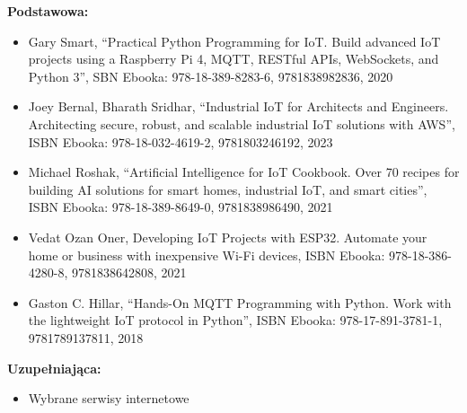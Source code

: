 \documentclass[12pt, a4paper]{article}
\begin{document}
\textbf{Podstawowa:}
\begin{itemize}
  \item Gary Smart, “Practical Python Programming for IoT. Build advanced IoT projects using a Raspberry Pi 4, MQTT, RESTful APIs, WebSockets, and Python 3”, SBN Ebooka: 978-18-389-8283-6, 9781838982836, 2020
  \item Joey Bernal, Bharath Sridhar, “Industrial IoT for Architects and Engineers. Architecting secure, robust, and scalable industrial IoT solutions with AWS”, ISBN Ebooka: 978-18-032-4619-2, 9781803246192, 2023
  \item Michael Roshak, “Artificial Intelligence for IoT Cookbook. Over 70 recipes for building AI solutions for smart homes, industrial IoT, and smart cities”, ISBN Ebooka: 978-18-389-8649-0, 9781838986490, 2021
  \item Vedat Ozan Oner, Developing IoT Projects with ESP32. Automate your home or business with inexpensive Wi-Fi devices, ISBN Ebooka: 978-18-386-4280-8, 9781838642808, 2021
  \item Gaston C. Hillar, “Hands-On MQTT Programming with Python. Work with the lightweight IoT protocol in Python”, ISBN Ebooka: 978-17-891-3781-1, 9781789137811, 2018
\end{itemize}

\textbf{Uzupełniająca:}
\begin{itemize}
  \item Wybrane serwisy internetowe
\end{itemize}
\end{document}
